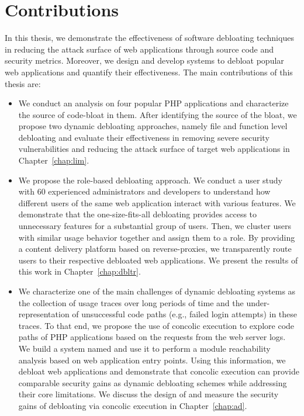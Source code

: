 \section{Contributions}

In this thesis, we demonstrate the effectiveness of software debloating techniques in reducing the attack surface of web applications through source code and security metrics. 
Moreover, we design and develop systems to debloat popular web applications and quantify their effectiveness. The main contributions of this thesis are:

\begin{itemize}
    \item We conduct an analysis on four popular PHP applications and characterize the source of code-bloat in them. After identifying the source of the bloat, we propose two dynamic debloating approaches, namely file and function level debloating and evaluate their effectiveness in removing severe security vulnerabilities and reducing the attack surface of target web applications in Chapter~\ref{chap:lim}.
    \item We propose the role-based debloating approach. We conduct a user study with 60 experienced administrators and developers to understand how different users of the same web application interact with various features. We demonstrate that the one-size-fits-all debloating provides access to unnecessary features for a substantial group of users. Then, we cluster users with similar usage behavior together and assign them to a role. By providing a content delivery platform based on reverse-proxies, we transparently route users to their respective debloated web applications. We present the results of this work in Chapter~\ref{chap:dbltr}. 
    \item We characterize one of the main challenges of dynamic debloating systems as the collection of usage traces over long periods of time and the under-representation of unsuccessful code paths (e.g., failed login attempts) in these traces. To that end, we propose the use of concolic execution to explore code paths of PHP applications based on the requests from the web server logs. We build a system named \animatedead{} and use it to perform a module reachability analysis based on web application entry points. Using this information, we debloat web applications and demonstrate that concolic execution can provide comparable security gains as dynamic debloating schemes while addressing their core limitations. We discuss the design of \animatedead{} and measure the security gains of debloating via concolic execution in Chapter~\ref{chap:ad}.
\end{itemize}